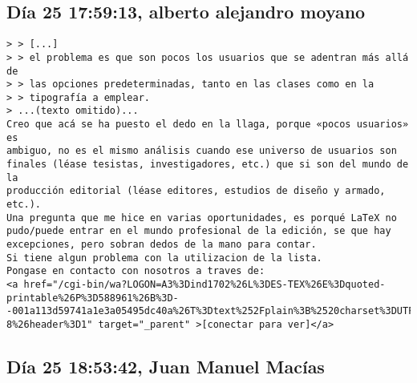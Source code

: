 \documentclass[a4paper,10pt]{article}
\begin{document}
\subsection{Día 25 17:59:13, alberto alejandro moyano}

\begin{lstlisting}
> > [...]
> > el problema es que son pocos los usuarios que se adentran más allá de
> > las opciones predeterminadas, tanto en las clases como en la
> > tipografía a emplear.
> ...(texto omitido)...
Creo que acá se ha puesto el dedo en la llaga, porque «pocos usuarios» es
ambiguo, no es el mismo análisis cuando ese universo de usuarios son
finales (léase tesistas, investigadores, etc.) que si son del mundo de la
producción editorial (léase editores, estudios de diseño y armado, etc.).
Una pregunta que me hice en varias oportunidades, es porqué LaTeX no
pudo/puede entrar en el mundo profesional de la edición, se que hay
excepciones, pero sobran dedos de la mano para contar.
Si tiene algun problema con la utilizacion de la lista.
Pongase en contacto con nosotros a traves de:
<a href="/cgi-bin/wa?LOGON=A3%3Dind1702%26L%3DES-TEX%26E%3Dquoted-printable%26P%3D588961%26B%3D--001a113d59741a1e3a05495dc40a%26T%3Dtext%252Fplain%3B%2520charset%3DUTF-8%26header%3D1" target="_parent" >[conectar para ver]</a>

\end{lstlisting}

\subsection{Día 25 18:53:42, Juan Manuel Macías}
\end{document}
